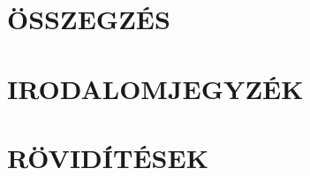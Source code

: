\documentclass[12pt,a4paper]{article}
\begin{document}
\clearpage
\section{ÖSSZEGZÉS}






\clearpage
\section{IRODALOMJEGYZÉK}
\printbibliography[heading=none]

\clearpage
\renewcommand{\listfigurename}{ÁBRAJEGYZÉK}
\listoffigures

\clearpage
\renewcommand{\listtablename}{TÁBLAJEGYZÉK}
\listoftables

\clearpage
\section{RÖVIDÍTÉSEK}

\end{document}
